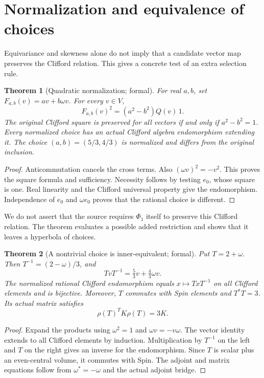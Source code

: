 \documentclass[11pt]{article}
\newtheorem{theorem}{Theorem}[section]
\begin{document}
\section{Normalization and equivalence of choices}
Equivariance and skewness alone do not imply that a candidate vector map preserves the Clifford relation. This gives a concrete test of an extra selection rule.

\begin{theorem}[Quadratic normalization; formal]
For real $a,b$, set $F_{a,b}(v)=av+b\omega v$. For every $v\in V$,
\[
 F_{a,b}(v)^2=(a^2-b^2)Q(v)\,1.
\]
The original Clifford square is preserved for all vectors if and only if $a^2-b^2=1$. Every normalized choice has an actual Clifford algebra endomorphism extending it. The choice $(a,b)=(5/3,4/3)$ is normalized and differs from the original inclusion.
\end{theorem}
\begin{proof}
Anticommutation cancels the cross terms. Also $(\omega v)^2=-v^2$. This proves the square formula and sufficiency. Necessity follows by testing $e_0$, whose square is one. Real linearity and the Clifford universal property give the endomorphism. Independence of $e_0$ and $\omega e_0$ proves that the rational choice is different.
\end{proof}

We do not assert that the source requires $\Phi_1$ itself to preserve this Clifford relation. The theorem evaluates a possible added restriction and shows that it leaves a hyperbola of choices.

\begin{theorem}[A nontrivial choice is inner-equivalent; formal]
Put $T=2+\omega$. Then $T^{-1}=(2-\omega)/3$, and
\[
 TvT^{-1}=\tfrac53v+\tfrac43\omega v.
\]
The normalized rational Clifford endomorphism equals $x\mapsto TxT^{-1}$ on all Clifford elements and is bijective. Moreover, $T$ commutes with Spin elements and $T^*T=3$. Its actual matrix satisfies
\[
 \rho(T)^T K\rho(T)=3K.
\]
\end{theorem}
\begin{proof}
Expand the products using $\omega^2=1$ and $\omega v=-v\omega$. The vector identity extends to all Clifford elements by induction. Multiplication by $T^{-1}$ on the left and $T$ on the right gives an inverse for the endomorphism. Since $T$ is scalar plus an even-central volume, it commutes with Spin. The adjoint and matrix equations follow from $\omega^*=-\omega$ and the actual adjoint bridge.
\end{proof}
\end{document}
